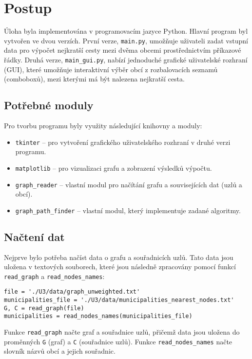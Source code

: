 \section{Postup}

Úloha byla implementována v programovacím jazyce Python. Hlavní program byl vytvořen ve dvou verzích. První verze, \texttt{main.py}, umožňuje uživateli zadat vstupní data pro výpočet nejkratší cesty mezi dvěma obcemi prostřednictvím příkazové řádky. Druhá verze, \texttt{main\_gui.py}, nabízí jednoduché grafické uživatelské rozhraní (GUI), které umožňuje interaktivní výběr obcí z rozbalovacích seznamů (comboboxů), mezi kterými má být nalezena nejkratší cesta.

\subsection{Potřebné moduly}
Pro tvorbu programu byly využity následující knihovny a moduly:
\begin{itemize}
    \item \texttt{tkinter} – pro vytvoření grafického uživatelského rozhraní v druhé verzi programu.
    \item \texttt{matplotlib} – pro vizualizaci grafu a zobrazení výsledků výpočtu.
    \item \texttt{graph\_reader} – vlastní modul pro načítání grafu a souvisejících dat (uzlů a obcí).
    \item \texttt{graph\_path\_finder} – vlastní modul, který implementuje zadané algoritmy.
\end{itemize}

\subsection{Načtení dat}
Nejprve bylo potřeba načíst data o grafu a souřadnicích uzlů. Tato data jsou uložena v textových souborech, které jsou následně zpracovány pomocí funkcí \texttt{read\_graph} a \texttt{read\_nodes\_names}:
\begin{verbatim}
file = './U3/data/graph_unweighted.txt'
municipalities_file = './U3/data/municipalities_nearest_nodes.txt'
G, C = read_graph(file)
municipalities = read_nodes_names(municipalities_file)
\end{verbatim}
Funkce \texttt{read\_graph} načte graf a souřadnice uzlů, přičemž data jsou uložena do proměnných \texttt{G} (graf) a \texttt{C} (souřadnice uzlů). Funkce \texttt{read\_nodes\_names} načte slovník názvů obcí a jejich souřadnic.

